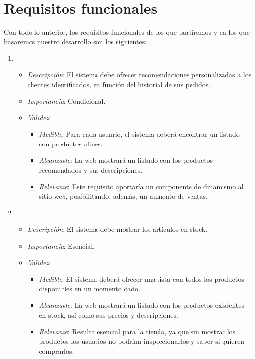 \section{Requisitos funcionales}

Con todo lo anterior, los requisitos funcionales de los que partiremos y en los que basaremos nuestro desarrollo son los siguientes:

\begin{enumerate}[{\bf RF-1}]
\item 
  \begin{itemize}
  \item \textit{Descripción}: El sistema debe ofrecer recomendaciones personalizadas a los clientes identificados, en función del historial de sus pedidos.
  \item \textit{Importancia}: Condicional.
  \item \textit{Validez}:
    \begin{itemize}
    \item \textit{Medible}: Para cada usuario, el sistema deberá encontrar un listado con productos afines.
    \item \textit{Alcanzable}: La web mostrará un listado con los productos recomendados y sus descripciones.
    \item \textit{Relevante}: Este requisito aportaría un componente de dinamismo al sitio web, posibilitando, además, un aumento de ventas.
    \end{itemize}
  \end{itemize}


\item 
  \begin{itemize}
  \item \textit{Descripción}: El sistema debe mostrar los artículos en stock.
  \item \textit{Importancia}: Esencial.
  \item \textit{Validez}:
    \begin{itemize}
    \item \textit{Medible}: El sistema deberá ofrecer una lista con todos los productos disponibles en un momento dado.
    \item \textit{Alcanzable}: La web mostrará un listado con los productos existentes en stock, así como sus precios y descripciones.
    \item \textit{Relevante}: Resulta esencial para la tienda, ya que sin mostrar los productos los usuarios no podrían inspeccionarlos y saber si quieren comprarlos.
    \end{itemize}
  \end{itemize}


\end{enumerate}
